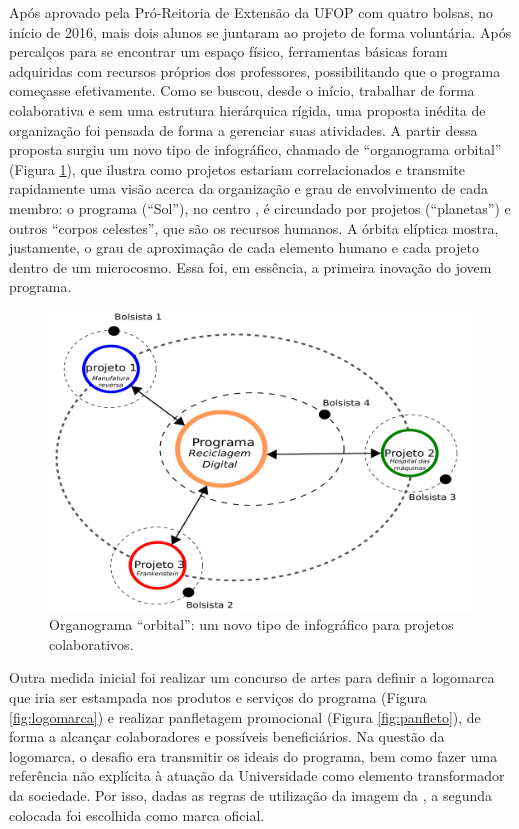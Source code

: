 \documentclass[a4paper]{ifacconf}
\begin{document}
Após aprovado pela Pró-Reitoria de Extensão da UFOP\cite{proex} com quatro bolsas, no início de 2016, mais dois alunos se juntaram ao projeto de forma voluntária. Após percalços para se encontrar um espaço físico, ferramentas básicas foram adquiridas com recursos próprios dos professores, possibilitando que o programa começasse efetivamente. Como se buscou, desde o início, trabalhar de forma colaborativa e sem uma estrutura hierárquica rígida, uma proposta inédita de organização foi pensada de forma a gerenciar suas atividades. A partir dessa proposta surgiu um novo tipo de infográfico, chamado de ``organograma orbital'' (Figura \ref{fig:organograma}), que ilustra como projetos estariam correlacionados e transmite rapidamente uma visão acerca da organização e grau de envolvimento de cada membro: o programa (``Sol''), no centro , é circundado por projetos (``planetas'') e outros ``corpos celestes'',  que são os recursos humanos. A órbita elíptica mostra, justamente, o grau de aproximação de cada elemento humano e cada projeto dentro de um microcosmo. Essa foi, em essência, a primeira inovação do jovem programa. 

\begin{figure}
	\begin{center}
		\includegraphics[scale=0.28]{figuras/organograma.pdf}
		\caption{Organograma ``orbital'': um novo tipo de infográfico para projetos colaborativos.} 
		\label{fig:organograma}
	\end{center}
\end{figure}

Outra medida inicial foi realizar um concurso de artes para definir a logomarca que iria ser estampada nos produtos e serviços do programa (Figura \ref{fig:logomarca}) e realizar panfletagem promocional (Figura \ref{fig:panfleto}), de forma a alcançar colaboradores e possíveis beneficiários. Na questão da logomarca, o desafio era transmitir os ideais do programa, bem como fazer uma referência não explícita à atuação da Universidade como elemento transformador da sociedade. Por isso, dadas as regras de utilização da imagem da \cite{ufop2007}, a segunda colocada foi escolhida como marca oficial. 
\end{document}
